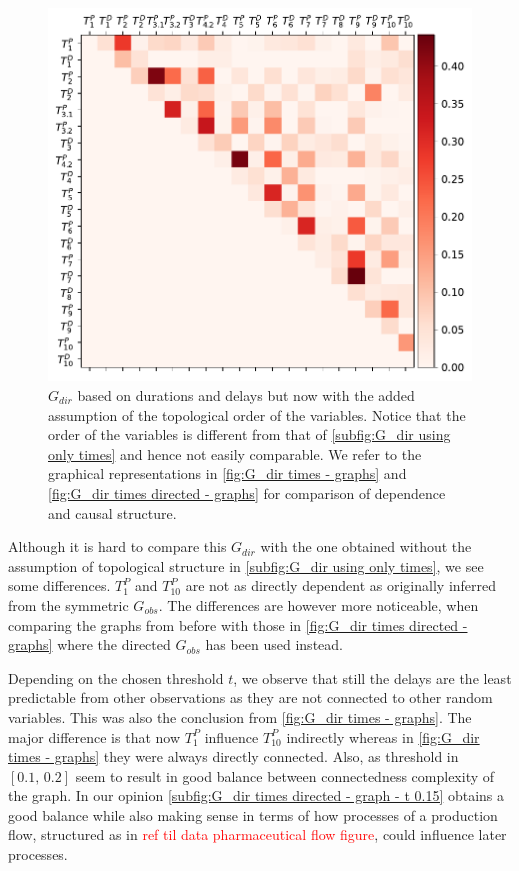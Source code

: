 \documentclass[../Thesis.tex]{subfiles}
\begin{document}
\begin{figure}[ht]
    \centering
    \includegraphics[width = .8\linewidth]{figures/Cycle data/G_dir times - directed.pdf}
    \caption{$G_{dir}$ based on durations and delays but now with the added assumption of the topological order of the variables. Notice that the order of the variables is different from that of \autoref{subfig:G_dir using only times} and hence not easily comparable. We refer to the graphical representations in \autoref{fig:G_dir times - graphs} and \autoref{fig:G_dir times directed - graphs} for comparison of dependence and causal structure.}
    \label{fig:G_dir times - directed}
\end{figure}
Although it is hard to compare this $G_{dir}$ with the one obtained without the assumption of topological structure in \autoref{subfig:G_dir using only times}, we see some differences. $T^P_1$ and $T^P_{10}$ are not as directly dependent as originally inferred from the symmetric $G_{obs}$. The differences are however more noticeable, when comparing the graphs from before with those in \autoref{fig:G_dir times directed - graphs} where the directed $G_{obs}$ has been used instead.

Depending on the chosen threshold $t$, we observe that still the delays are the least predictable from other observations as they are not connected to other random variables. This was also the conclusion from \autoref{fig:G_dir times - graphs}. The major difference is that now $T^P_1$ influence $T^P_{10}$ indirectly whereas in \autoref{fig:G_dir times - graphs} they were always directly connected. Also, as threshold in $[0.1,\, 0.2]$ seem to result in good balance between connectedness complexity of the graph. In our opinion \autoref{subfig:G_dir times directed - graph - t 0.15} obtains a good balance while also making sense in terms of how processes of a production flow, structured as in \textcolor{red}{ref til data pharmaceutical flow figure}, could influence later processes.
\end{document}
